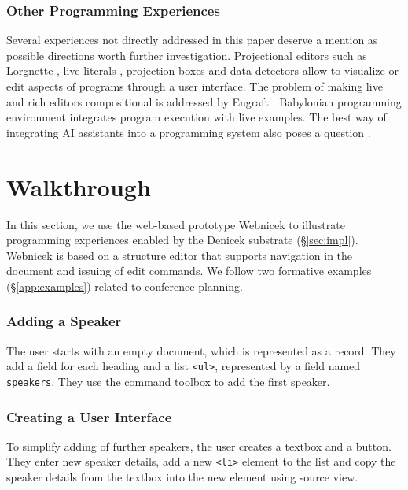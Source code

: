 \documentclass[sigconf,anonymous,screen]{acmart}
\newcommand*\circled[1]{\textnormal{\footnotesize\sffamily\bfseries\protect\tikz[baseline=(char.base)]{
  \node[shape=circle,fill=black,text=white,draw,inner sep=1pt] (char) {#1};}}}
\begin{document}
\subsubsection*{Other Programming Experiences}
Several experiences not directly addressed in this paper deserve a mention as possible directions
worth further investigation. Projectional editors such as Lorgnette \cite{gobert-2023-lorgnette},
live literals \cite{omar-2021-livelits}, projection boxes \cite{lerner-2020-boxes} and data detectors
\cite{nardi-1998-agents} allow to visualize or edit aspects of programs through a user interface.
The problem of making live and rich editors compositional is addressed by
Engraft \cite{horowitz-2023-engraft}. Babylonian programming environment \cite{rauch-2019-babylonian}
integrates program execution with live examples. The best way of integrating AI assistants
into a programming system also poses a question \cite{petricek-2023-aias,blinn-2024-llms,mcnutt-2023-nbai}.



\section{Walkthrough}
\label{sec:walk}

In this section, we use the web-based prototype Webnicek to illustrate programming
experiences enabled by the Denicek substrate (\S\ref{sec:impl}). Webnicek is based on a structure
editor that supports navigation in the document and issuing of edit commands. We follow two
formative examples (\S\ref{app:examples}) related to conference planning.

\subsubsection*{\circled{A} Adding a Speaker}
The user starts with an empty document, which is represented as a record. They add a field for
each heading and a list {\small\Verb_<ul>_}, represented by a field named {\small\Verb_speakers_}. They use the command
toolbox to add the first speaker.

\subsubsection*{\circled{B} Creating a User Interface} To simplify adding of
further speakers, the user creates a textbox and a button. They enter new speaker
details, add a new {\small\Verb_<li>_} element to the list and copy the speaker details
from the textbox into the new element using source view.
\end{document}
